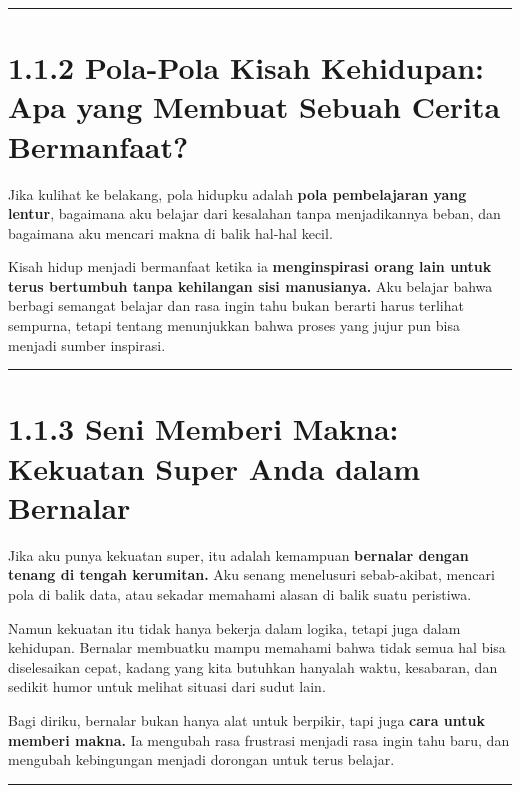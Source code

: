 \documentclass[
  letterpaper,
  DIV=11,
  numbers=noendperiod]{scrreprt}
\begin{document}
\begin{center}\rule{0.5\linewidth}{0.5pt}\end{center}

\section{1.1.2 Pola-Pola Kisah Kehidupan: Apa yang Membuat Sebuah Cerita
Bermanfaat?}\label{pola-pola-kisah-kehidupan-apa-yang-membuat-sebuah-cerita-bermanfaat}

Jika kulihat ke belakang, pola hidupku adalah \textbf{pola pembelajaran
yang lentur}, bagaimana aku belajar dari kesalahan tanpa menjadikannya
beban, dan bagaimana aku mencari makna di balik hal-hal kecil.

Kisah hidup menjadi bermanfaat ketika ia \textbf{menginspirasi orang
lain untuk terus bertumbuh tanpa kehilangan sisi manusianya.} Aku
belajar bahwa berbagi semangat belajar dan rasa ingin tahu bukan berarti
harus terlihat sempurna, tetapi tentang menunjukkan bahwa proses yang
jujur pun bisa menjadi sumber inspirasi.

\begin{center}\rule{0.5\linewidth}{0.5pt}\end{center}

\section{1.1.3 Seni Memberi Makna: Kekuatan Super Anda dalam
Bernalar}\label{seni-memberi-makna-kekuatan-super-anda-dalam-bernalar}

Jika aku punya kekuatan super, itu adalah kemampuan \textbf{bernalar
dengan tenang di tengah kerumitan.} Aku senang menelusuri sebab-akibat,
mencari pola di balik data, atau sekadar memahami alasan di balik suatu
peristiwa.

Namun kekuatan itu tidak hanya bekerja dalam logika, tetapi juga dalam
kehidupan. Bernalar membuatku mampu memahami bahwa tidak semua hal bisa
diselesaikan cepat, kadang yang kita butuhkan hanyalah waktu, kesabaran,
dan sedikit humor untuk melihat situasi dari sudut lain.

Bagi diriku, bernalar bukan hanya alat untuk berpikir, tapi juga
\textbf{cara untuk memberi makna.} Ia mengubah rasa frustrasi menjadi
rasa ingin tahu baru, dan mengubah kebingungan menjadi dorongan untuk
terus belajar.

\begin{center}\rule{0.5\linewidth}{0.5pt}\end{center}
\end{document}
